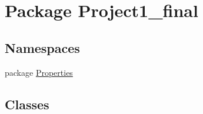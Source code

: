 \hypertarget{namespace_project1__final}{\section{Package Project1\+\_\+final}
\label{namespace_project1__final}
}
\subsection*{Namespaces}
\begin{DoxyCompactItemize}
\item 
package \hyperlink{namespace_project1__final_1_1_properties}{Properties}
\end{DoxyCompactItemize}
\subsection*{Classes}
